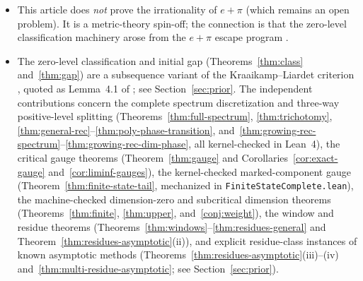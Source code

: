 \begin{itemize}[leftmargin=1.5em]
subcritical three-term asymptotics to $O((\log m)^2/m^3)$ with coefficient
$\frac12 d^2 C_S(\gamma C_S-C_S')$, and supercritical $\Theta(m^{-2s_0})$
convergence rate) are kernel-checked at Layer~A in
\texttt{EpiFormal/\allowbreak Residue\allowbreak Multi\allowbreak Asymptotic.lean}
($24$ public theorems audited separately in
\texttt{AuditResidueMultiAsymptotic.lean}, base axioms only, zero \texttt{sorryAx},
log \texttt{verification/\allowbreak audit\_\allowbreak residue\_\allowbreak multi\_\allowbreak asymptotic\_\allowbreak 20261123.log})
and numerically corroborated by
\texttt{verify\_\allowbreak residue\_\allowbreak multi\_\allowbreak asymptotic.py}.
\item This article does \emph{not} prove the irrationality of $e+\pi$ (which
remains an open problem). It is a metric-theory spin-off; the connection is
that the zero-level classification machinery arose from the $e+\pi$ escape
program \cite{Phase1}.
\item The zero-level classification and initial gap (Theorems~\ref{thm:class}
and~\ref{thm:gap}) are a subsequence variant of the Kraaikamp--Liardet
criterion \cite{KL}, quoted as Lemma~4.1 of \cite{BDS}; see
Section~\ref{sec:prior}. The independent contributions concern the complete
spectrum discretization and three-way positive-level splitting
(Theorems~\ref{thm:full-spectrum}, \ref{thm:trichotomy},
\ref{thm:general-rec}--\ref{thm:poly-phase-transition},
and~\ref{thm:growing-rec-spectrum}--\ref{thm:growing-rec-dim-phase}, all kernel-checked
in Lean~4), the critical gauge theorems
(Theorem~\ref{thm:gauge} and Corollaries~\ref{cor:exact-gauge}
and~\ref{cor:liminf-gauges}), the kernel-checked marked-component gauge
(Theorem~\ref{thm:finite-state-tail}, mechanized in
\texttt{Finite\allowbreak State\allowbreak Complete.lean}), the machine-checked
dimension-zero and subcritical dimension theorems
(Theorems~\ref{thm:finite}, \ref{thm:upper}, and~\ref{conj:weight}), the
window and residue theorems (Theorems~\ref{thm:windows}--\ref{thm:residues-general}
and Theorem~\ref{thm:residues-asymptotic}(ii)), and explicit residue-class
instances of known asymptotic methods
(Theorems~\ref{thm:residues-asymptotic}(iii)--(iv)
and~\ref{thm:multi-residue-asymptotic}; see Section~\ref{sec:prior}).
\end{itemize}

